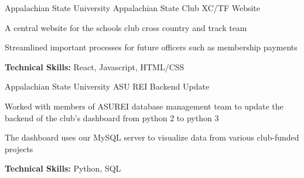 

\begin{cventries}

  \cventry
    {Appalachian State University} %
    {Appalachian State Club XC/TF Website} %
    {} %
    {} %
    {
      \begin{cvitems} %
        \item {A central website for the schools club cross country and track team}
        \item {Streamlined important processes for future officers such as membership payments}
        \item {\textbf{Technical Skills:} React, Javascript, HTML/CSS}
      \end{cvitems}
    }

  \cventry
    {Appalachian State University} %
    {ASU REI Backend Update} %
    {} %
    {} %
    {
      \begin{cvitems} %
        \item {Worked with members of ASUREI database management team to update the backend of the club's dashboard from python 2 to python 3}
        \item {The dashboard uses our MySQL server to visualize data from various club-funded projects}
        \item {\textbf{Technical Skills:} Python, SQL}
      \end{cvitems}
    }


\end{cventries}
